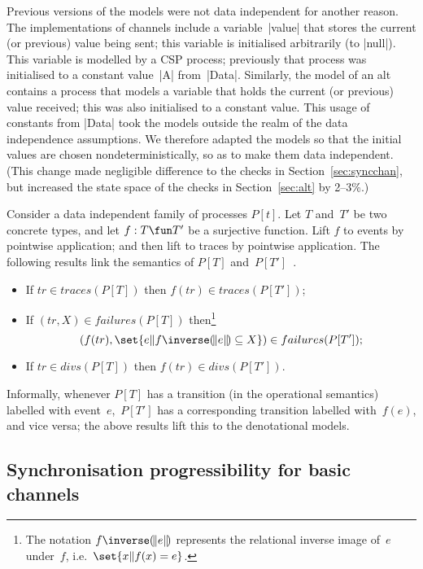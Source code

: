Previous versions of the models were not data independent for another reason.
The implementations of channels include a variable~|value| that stores the
current (or previous) value being sent; this variable is initialised
arbitrarily (to |null|).  This variable is modelled by a CSP process;
previously that process was initialised to a constant value~|A| from~|Data|.
Similarly, the model of an alt contains a process that models a variable that
holds the current (or previous) value received; this was also initialised to a
constant value.  This usage of constants from |Data| took the models outside
the realm of the data independence assumptions.  We therefore adapted the
models so that the initial values are chosen nondeterministically, so as to
make them data independent.  (This change made negligible difference to the
checks in Section~\ref{sec:syncchan}, but increased the state space of the
checks in Section~\ref{sec:alt} by 2--3\%.)

Consider a data independent family of processes $P[t]$.  Let $T$ and~$T'$ be
two concrete types, and let $f: T \fun T'$ be a surjective function.  Lift $f$
to events by pointwise application; and then lift to traces by pointwise
application.  The following results link the semantics of $P[T]$
and~$P[T']$~\cite{gavin:di}. 
%
\begin{itemize}
\item If $tr \in traces(P[T])$ then $f(tr) \in traces(P[T'])$;

\item If $(tr,X) \in failures(P[T])$ then\footnote{The notation
  $f\inverse\banana{e}$ represents the relational inverse image of~$e$
  under~$f$, i.e.~$\set{x \| f(x) = e}$.}
\[
(f(tr), \set{e \|  f\inverse\banana{e} \subseteq X}) \in failures(P[T']);
\]

\item If $tr \in divs(P[T])$ then $f(tr) \in divs(P[T'])$. 
\end{itemize}
%
Informally, whenever $P[T]$ has a transition (in the operational semantics)
labelled with event~$e$,\, $P[T']$ has a corresponding transition labelled
with~$f(e)$, and vice versa; the above results lift this to the denotational
models.


\subsection{Synchronisation progressibility for basic channels}


